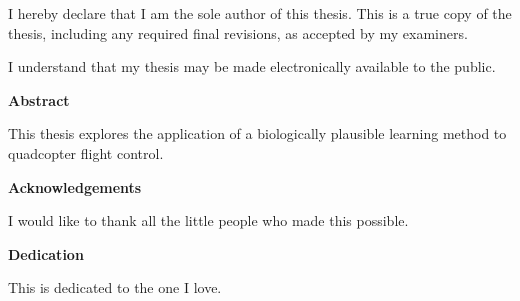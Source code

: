 \cleardoublepage %
 


  \noindent
I hereby declare that I am the sole author of this thesis. This is a true copy of the thesis, including any required final revisions, as accepted by my examiners.

  \bigskip
  
  \noindent
I understand that my thesis may be made electronically available to the public.

\cleardoublepage


\begin{center}\textbf{Abstract}\end{center}

This thesis explores the application of a biologically plausible learning method to quadcopter flight control.

\cleardoublepage


\begin{center}\textbf{Acknowledgements}\end{center}

I would like to thank all the little people who made this possible.
\cleardoublepage


\begin{center}\textbf{Dedication}\end{center}

This is dedicated to the one I love.
\cleardoublepage

\renewcommand\contentsname{Table of Contents}
\tableofcontents
\cleardoublepage
{}

\listoftables
\cleardoublepage
{}		%

